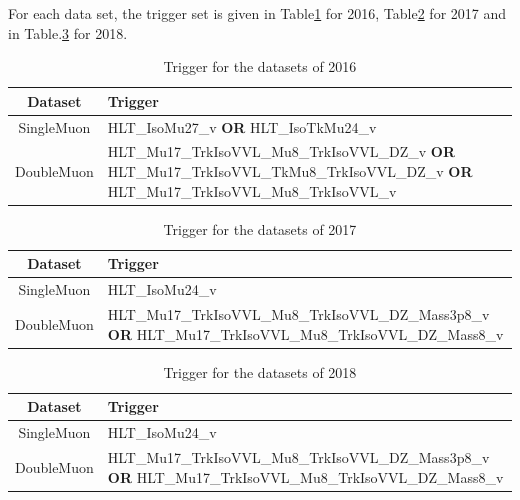 \documentclass{cernatlasnote}
\begin{document}
For each data set, the trigger set is given in Table\ref{tab:TRIGGER2016} for 2016, Table\ref{tab:TRIGGER2017} for 2017 and in Table.\ref{tab:TRIGGER2018} for 2018. 

\begin{table}[h]
\centering
\begin{tabular}{|c|p{12cm}|}
  \hline
  \rowcolor{lightgray} 
  Dataset & Trigger \\
  \hline
  SingleMuon & HLT\_IsoMu27\_v \textbf{OR}  HLT\_IsoTkMu24\_v\\
  \hline
  DoubleMuon & HLT\_Mu17\_TrkIsoVVL\_Mu8\_TrkIsoVVL\_DZ\_v \textbf{OR} HLT\_Mu17\_TrkIsoVVL\_TkMu8\_TrkIsoVVL\_DZ\_v \textbf{OR} HLT\_Mu17\_TrkIsoVVL\_Mu8\_TrkIsoVVL\_v  \\
  \hline
\end{tabular}
    \caption{Trigger for the datasets of 2016}
    \label{tab:TRIGGER2016}
\end{table}

\begin{table}[h]
\centering
\begin{tabular}{|c|p{13 cm}|}
  \hline
  \rowcolor{lightgray} 
  Dataset & Trigger \\
  \hline
  SingleMuon & HLT\_IsoMu24\_v\\
  \hline
  DoubleMuon & HLT\_Mu17\_TrkIsoVVL\_Mu8\_TrkIsoVVL\_DZ\_Mass3p8\_v \textbf{OR} HLT\_Mu17\_TrkIsoVVL\_Mu8\_TrkIsoVVL\_DZ\_Mass8\_v \\
  \hline
\end{tabular}
    \caption{Trigger for the datasets of 2017}
    \label{tab:TRIGGER2017}
\end{table}



\begin{table}[h]
\centering
\begin{tabular}{|c|p{13 cm}|}
  \hline
  \rowcolor{lightgray} 
  Dataset & Trigger \\
  \hline
  SingleMuon & HLT\_IsoMu24\_v\\
  \hline
  DoubleMuon & HLT\_Mu17\_TrkIsoVVL\_Mu8\_TrkIsoVVL\_DZ\_Mass3p8\_v \textbf{OR} HLT\_Mu17\_TrkIsoVVL\_Mu8\_TrkIsoVVL\_DZ\_Mass8\_v\\
  \hline
\end{tabular}
    \caption{Trigger for the datasets of 2018}
    \label{tab:TRIGGER2018}
\end{table}

\FloatBarrier
\end{document}
